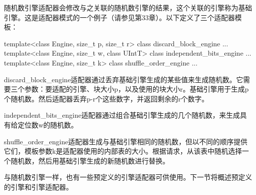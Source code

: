 随机数引擎适配器会修改与之关联的随机数引擎的结果，这个关联的引擎称为基础引擎。这是适配器模式的一个例子（请参见第33章）。以下定义了三个适配器模板：

\begin{cpp}
template<class Engine, size_t p, size_t r> class discard_block_engine {...}
template<class Engine, size_t w, class UIntT> class independent_bits_engine {...}
template<class Engine, size_t k> class shuffle_order_engine {...}
\end{cpp}

discard\_block\_engine适配器通过丢弃基础引擎生成的某些值来生成随机数。它需要三个参数：要适配的引擎、块大小p，以及使用的块大小r。基础引擎用于生成p个随机数。然后适配器丢弃p-r个这些数字，并返回剩余的r个数字。

independent\_bits\_engine适配器通过组合基础引擎生成的几个随机数，来生成具有给定位数w的随机数。

shuffle\_order\_engine适配器生成与基础引擎相同的随机数，但以不同的顺序提供它们，模板参数k是适配器使用的内部表的大小。根据请求，从该表中随机选择一个随机数，然后用基础引擎生成的新随机数进行替换。

与随机数引擎一样，也有一些预定义的引擎适配器可供使用。下一节将概述预定义的引擎和引擎适配器。


























